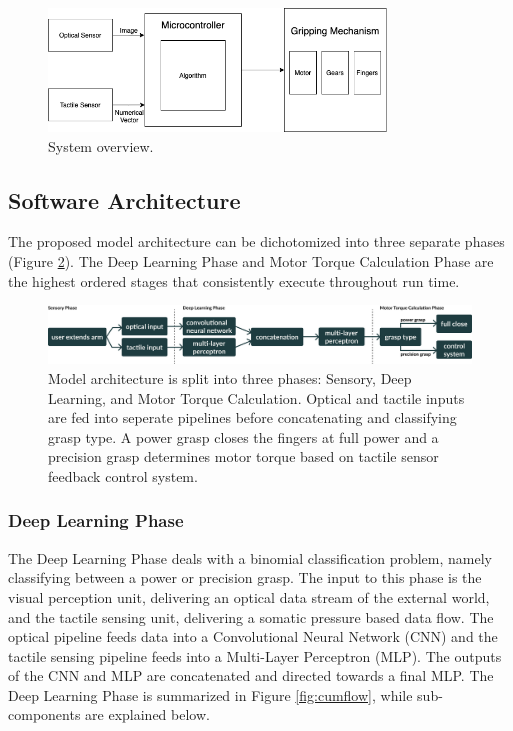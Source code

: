 \documentclass[11.5pt]{article}
\begin{document}
\begin{figure}[H]
    \centering
    \includegraphics[width=0.8\textwidth]{Circuits/Hardglow.png}
    \caption{System overview.}
    \label{fig:HGI}
\end{figure}
 
\subsection{Software Architecture}
The proposed model architecture can be dichotomized into three separate phases (Figure \ref{fig:overall}). The Deep Learning Phase and Motor Torque Calculation Phase are the highest ordered stages that consistently execute throughout run time.

\begin{figure}[H]
    \centering
    \includegraphics[width=1.0\textwidth]{assets/Model.png}
    \caption{Model architecture is split into three phases: Sensory, Deep Learning, and Motor Torque Calculation. Optical and tactile inputs are fed into seperate pipelines before concatenating and classifying grasp type. A power grasp closes the fingers at full power and a precision grasp determines motor torque based on tactile sensor feedback control system.}
    \label{fig:overall}
\end{figure}

\subsubsection{Deep Learning Phase}

The Deep Learning Phase deals with a binomial classification problem, namely classifying between a power or precision grasp. The input to this phase is the visual perception unit, delivering an optical data stream of the external world, and the tactile sensing unit, delivering a somatic pressure based data flow. The optical pipeline feeds data into a Convolutional Neural Network (CNN) and the tactile sensing pipeline feeds into a Multi-Layer Perceptron (MLP). The outputs of the CNN and MLP are concatenated and directed towards a final MLP. The Deep Learning Phase is summarized in Figure \ref{fig:cumflow}, while sub-components are explained below.
\end{document}

